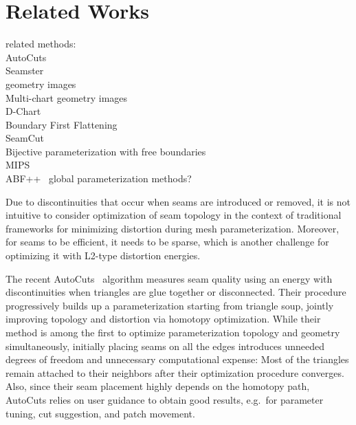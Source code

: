 
\section{Related Works}

related methods:\\
AutoCuts~\cite{Poranne2017Autocuts}\\
Seamster~\cite{Sheffer2002Seamster}\\
geometry images~\cite{Gu2002Geometry}\\
Multi-chart geometry images~\cite{Snyder2003Multi}\\
D-Chart~\cite{Julius2005D}\\
Boundary First Flattening~\cite{Sawhney:2017}\\
SeamCut~\cite{Lucquin:2017}\\
Bijective parameterization with free boundaries~\cite{Smith2015Bijective}\\
MIPS~\cite{Hormann2000MIPS}\\
ABF++~\cite{Sheffer2005ABFPP}
global parameterization methods?

Due to discontinuities that occur when seams are introduced or removed, it is not intuitive to consider optimization of seam topology in the context of traditional frameworks for minimizing distortion during mesh parameterization.
%
Moreover, for seams to be efficient, it needs to be sparse, which is another challenge for optimizing it with L2-type distortion energies.


The recent AutoCuts~\cite{Poranne2017Autocuts} algorithm measures seam quality using an energy with discontinuities when triangles are glue together or disconnected.  Their procedure progressively builds up a parameterization starting from triangle soup, jointly improving topology and distortion via homotopy optimization. 
%
While their method is among the first to optimize parameterization topology and geometry simultaneously, 
initially placing seams on all the edges introduces unneeded degrees of freedom and unnecessary computational expense:  Most of the triangles remain attached to their neighbors after their optimization procedure converges. Also, since their seam placement highly depends on the homotopy path, AutoCuts relies on user guidance to obtain good results, e.g.\ for parameter tuning, cut suggestion, and patch movement. %

